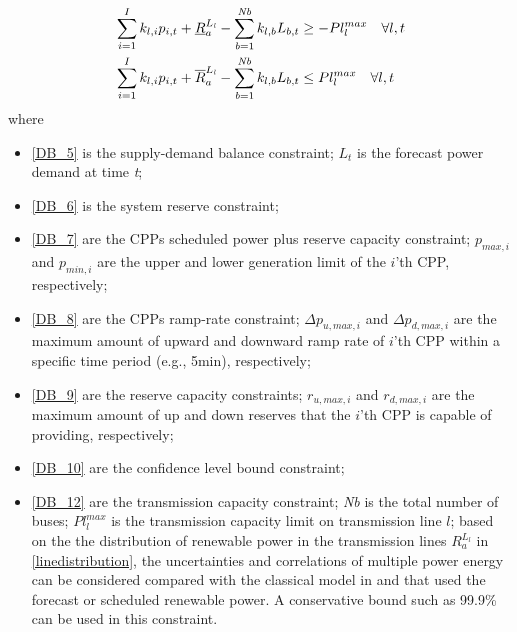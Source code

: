 \vspace{-1em}

\begin{equation} \label{DB_12}
\begin{aligned}
\begin{aligned}
& \sum_{i=1}^{I}k_{l,i}p_{i,t}+\underline{R}_{a}^{L_{\it l}}-\sum_{{\it b}=1}^{{\it Nb}}k_{l,b}L_{b,t} \ge -Pl_l^{max}  \quad \forall l,t\\
& \sum_{i=1}^{I}k_{l,i}p_{i,t}+\overline{R}_{a}^{L_{\it l}}-\sum_{{\it b}=1}^{{\it Nb}}k_{l,b}L_{b,t} \le  Pl_l^{max}  \quad \forall l,t
\end{aligned}
\end{aligned}
\end{equation}
where
\begin{itemize}

	\item \eqref{DB_5} is the supply-demand balance constraint; $L_{t}$ is the forecast power demand at time {\it t};

	\item \eqref{DB_6} is the system reserve constraint;

	\item \eqref{DB_7} are the CPPs scheduled power plus reserve capacity constraint;  $p_{max,i}$  and   $p_{min,i}$ are the upper and lower generation limit of the $i$'th CPP, respectively;

	\item \eqref{DB_8} are the CPPs ramp-rate constraint; $\Delta p_{u,max,i}$ and $\Delta p_{d,max,i}$ are the maximum amount of upward and downward ramp rate of $i$'th CPP within a specific time period (e.g., 5min), respectively;

	\item \eqref{DB_9} are the reserve capacity constraints; $r_{u,max,i}$ and $r_{d,max,i}$ are the maximum amount of up and down reserves that the $i$'th CPP is capable of providing, respectively;

	\item \eqref{DB_10} are the confidence level bound constraint;


	\item \eqref{DB_12} are the transmission capacity constraint; {\it Nb} is the total number of buses; $Pl_l^{max}$ is the transmission capacity limit on transmission line $l$; based on the the distribution of renewable power in the transmission lines $R_{a}^{L_l}$ in \eqref{linedistribution}, the uncertainties and correlations of multiple power energy can be considered compared with the classical model in \cite{AI} and  \cite{VersatileMixture} that used the forecast or scheduled renewable power. A conservative bound such as 99.9\% can be used in this constraint.
\end{itemize}
